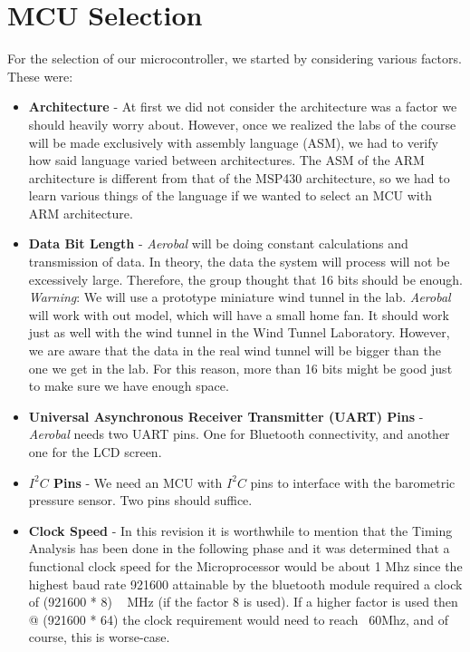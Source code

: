 \section{MCU Selection}
	For the selection of our microcontroller, we started by considering various factors. These were: 
	
	\begin{itemize}
	\item \textbf{Architecture} - At first we did not consider the architecture was a factor we should heavily worry about. However, once we realized the labs of the course will be made exclusively with assembly language (ASM), we had to verify how said language varied between architectures. The ASM of the ARM architecture is different from that of the MSP430 architecture, so we had to learn various things of the language if we wanted to select an MCU with ARM architecture. 	
	
  	\item \textbf{Data Bit Length} - \textit{Aerobal} will be doing constant calculations and transmission of data. In theory, the data  the system will process will not be excessively large. Therefore, the group thought that 16 bits should be enough. \textit{Warning}: We will use a prototype miniature wind tunnel in the lab. \textit{Aerobal} will work with out model, which will have a small home fan. It should work just as well with the wind tunnel in the Wind Tunnel Laboratory. However, we are aware that the data in the real wind tunnel will be bigger than the one we get in the lab. For this reason, more than 16 bits might be good just to make sure we have enough space.
  	
 	  \item \textbf{Universal Asynchronous Receiver Transmitter (UART) Pins} - \textit{Aerobal} needs two UART pins. One for Bluetooth connectivity, and another one for the LCD screen. 
 	
  	\item \textbf{$I^2C$ Pins} - We need an MCU with $I^2C$ pins to interface with the barometric pressure sensor. Two pins should suffice.
  	
 	  \item \textbf{Clock Speed} - In this revision it is worthwhile to mention that the Timing Analysis has been done in the following phase and it was determined that a functional clock speed for the Microprocessor would be about 1 Mhz since the highest baud rate 921600 attainable by the bluetooth module required a clock of (921600 * 8) ~ MHz (if the factor 8 is used). If a higher factor is used then @ (921600 * 64) the clock requirement would need to reach ~60Mhz, and of course, this is worse-case.


\end{itemize}
